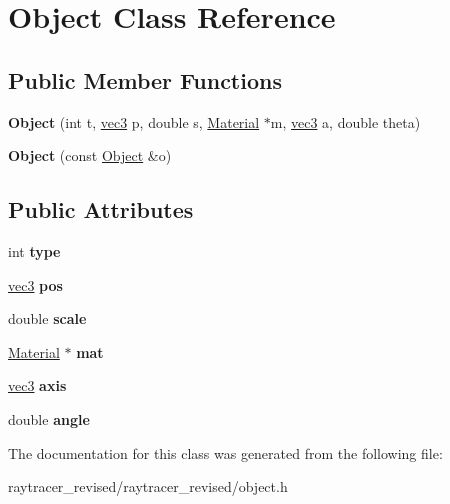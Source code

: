 \hypertarget{class_object}{
\section{Object Class Reference}
\label{class_object}
}
\subsection*{Public Member Functions}
\begin{DoxyCompactItemize}
\item 
\hypertarget{class_object_abd90d0da0a727046edef4a7dbbb1eb9d}{
{\bfseries Object} (int t, \hyperlink{classvec3}{vec3} p, double s, \hyperlink{struct_material}{Material} $\ast$m, \hyperlink{classvec3}{vec3} a, double theta)}
\label{class_object_abd90d0da0a727046edef4a7dbbb1eb9d}

\item 
\hypertarget{class_object_a99be7263a1ee29bfd8114523e072a74a}{
{\bfseries Object} (const \hyperlink{class_object}{Object} \&o)}
\label{class_object_a99be7263a1ee29bfd8114523e072a74a}

\end{DoxyCompactItemize}
\subsection*{Public Attributes}
\begin{DoxyCompactItemize}
\item 
\hypertarget{class_object_a63af4a55e2e4b6b6b8227c435f7237fb}{
int {\bfseries type}}
\label{class_object_a63af4a55e2e4b6b6b8227c435f7237fb}

\item 
\hypertarget{class_object_acab4a295a4c3c7353753786ccb02be6a}{
\hyperlink{classvec3}{vec3} {\bfseries pos}}
\label{class_object_acab4a295a4c3c7353753786ccb02be6a}

\item 
\hypertarget{class_object_adc7501c5528b8126d0bd5a9494e62c06}{
double {\bfseries scale}}
\label{class_object_adc7501c5528b8126d0bd5a9494e62c06}

\item 
\hypertarget{class_object_af7066c96704ea0205d97818e6390153a}{
\hyperlink{struct_material}{Material} $\ast$ {\bfseries mat}}
\label{class_object_af7066c96704ea0205d97818e6390153a}

\item 
\hypertarget{class_object_a78708ae929b4aee3acde87706c79312e}{
\hyperlink{classvec3}{vec3} {\bfseries axis}}
\label{class_object_a78708ae929b4aee3acde87706c79312e}

\item 
\hypertarget{class_object_aa08efab6c2c6898b1d0d7103076d8674}{
double {\bfseries angle}}
\label{class_object_aa08efab6c2c6898b1d0d7103076d8674}

\end{DoxyCompactItemize}


The documentation for this class was generated from the following file:\begin{DoxyCompactItemize}
\item 
raytracer\_\-revised/raytracer\_\-revised/object.h\end{DoxyCompactItemize}
